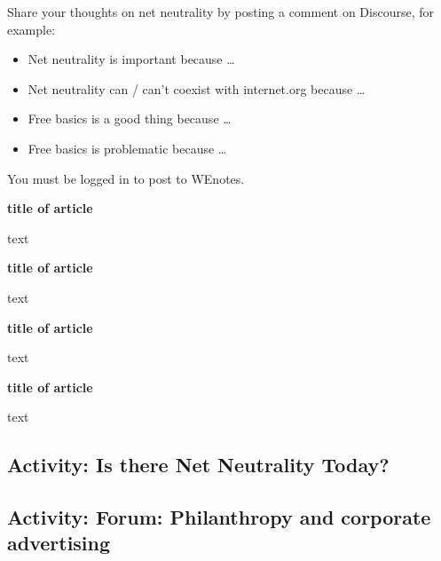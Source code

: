 \documentclass[
]{book}
\providecommand{\tightlist}{%
  \setlength{\itemsep}{0pt}\setlength{\parskip}{0pt}}
\theoremstyle{definition}
\theoremstyle{definition}
\theoremstyle{definition}
\theoremstyle{definition}
\theoremstyle{remark}
\begin{document}
\begin{reflect}
Share your thoughts on net neutrality by posting a comment on Discourse, for example:

\begin{itemize}
\tightlist
\item
  Net neutrality is important because \ldots{}\\
\item
  Net neutrality can / can't coexist with internet.org because \ldots{}\\
\item
  Free basics is a good thing because \ldots{}\\
\item
  Free basics is problematic because \ldots{}
\end{itemize}

You must be logged in to post to WEnotes.

\textbf{title of article}

text

\textbf{title of article}

text

\textbf{title of article}

text

\textbf{title of article}

text
\end{reflect}

\hypertarget{activity-is-there-net-neutrality-today}{%
\subsection*{Activity: Is there Net Neutrality Today?}\label{activity-is-there-net-neutrality-today}}

\begin{reflect}
\end{reflect}

\hypertarget{activity-forum-philanthropy-and-corporate-advertising-1}{%
\subsection*{Activity: Forum: Philanthropy and corporate advertising}\label{activity-forum-philanthropy-and-corporate-advertising-1}}

\begin{reflect}
\end{reflect}
\end{document}
